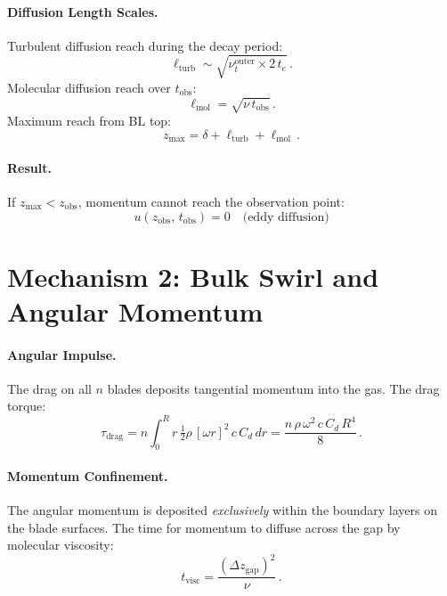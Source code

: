 \documentclass[11pt,a4paper]{article}
\begin{document}
\paragraph{Diffusion Length Scales.}
Turbulent diffusion reach during the decay period:
\begin{equation}
  \ell_\mathrm{turb} \sim \sqrt{\nu_t^\mathrm{outer} \times 2\,t_e}\,.
  \label{eq:ell_turb}
\end{equation}
Molecular diffusion reach over $t_\mathrm{obs}$:
\begin{equation}
  \ell_\mathrm{mol} = \sqrt{\nu\, t_\mathrm{obs}}\,.
  \label{eq:ell_mol}
\end{equation}
Maximum reach from BL top:
\begin{equation}
  z_\mathrm{max} = \delta + \ell_\mathrm{turb} + \ell_\mathrm{mol}\,.
\end{equation}

\paragraph{Result.}
If $z_\mathrm{max} < z_\mathrm{obs}$, momentum cannot reach the
observation point:
\begin{equation}
  \boxed{u(z_\mathrm{obs},\, t_\mathrm{obs}) = 0
    \quad \text{(eddy diffusion)}}
\end{equation}


\section{Mechanism 2: Bulk Swirl and Angular Momentum}
\label{sec:swirl}

\paragraph{Angular Impulse.}
The drag on all $n$ blades deposits tangential momentum into the gas.
The drag torque:
\begin{equation}
  \tau_\mathrm{drag} = n \int_0^R r\, \tfrac{1}{2}\rho\,[\omega r]^2\,c\,C_d\, dr
      = \frac{n\,\rho\,\omega^2\,c\,C_d\,R^4}{8}\,.
  \label{eq:torque}
\end{equation}

\paragraph{Momentum Confinement.}
The angular momentum is deposited \emph{exclusively} within the
boundary layers on the blade surfaces. The time for momentum to diffuse
across the gap by molecular viscosity:
\begin{equation}
  t_\mathrm{visc}
    = \frac{(\Delta z_\mathrm{gap})^2}{\nu}\,.
  \label{eq:tvisc}
\end{equation}
\end{document}
